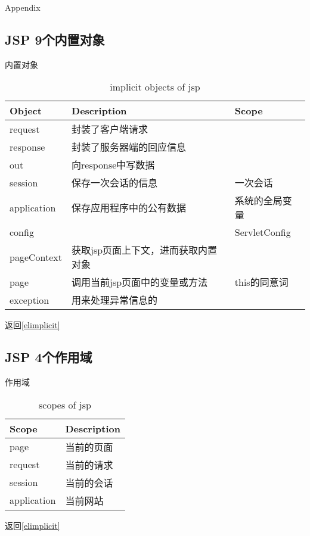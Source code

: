 \documentclass{beamer}
\begin{document}
\begin{frame}
\Huge{\centerline{Appendix}}
\end{frame}

\subsection{JSP 9个内置对象}
\begin{frame}{内置对象}
\label{implicitobj}
\begin{table}
\begin{tabular}{lll}
\toprule
\textbf{Object}&\textbf{Description}&\textbf{Scope}\\
\midrule
request&封装了客户端请求&\\
response&封装了服务器端的回应信息&\\
out&向response中写数据&\\
session&保存一次会话的信息&一次会话\\
application&保存应用程序中的公有数据&系统的全局变量\\
config&&ServletConfig\\
pageContext&获取jsp页面上下文，进而获取内置对象&\\
page&调用当前jsp页面中的变量或方法&this的同意词\\
exception&用来处理异常信息的&\\
\bottomrule
\end{tabular}
\caption{implicit objects of jsp}

\end{table}
返回\ref{elimplicit}
\end{frame}
\subsection{JSP 4个作用域}
\begin{frame}{作用域}
\begin{table}
\label{scope}
\begin{tabular}{ll}
\toprule
\textbf{Scope}&\textbf{Description}\\
\midrule
page&当前的页面\\
request&当前的请求\\
session&当前的会话\\
application&当前网站\\
\bottomrule
\end{tabular}
\caption{scopes of jsp}
\end{table}
返回\ref{elimplicit}
\end{frame}
\end{document}
